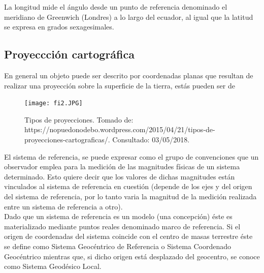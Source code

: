 \documentclass[12pt,hidelinks]{article}
\begin{document}
La longitud mide el ángulo desde un punto de referencia denominado el meridiano de
Greenwich (Londres) a lo largo del ecuador, al igual que la latitud se expresa en grados
sexagesimales.
\subsection{Proyeccción cartográfica}
En general un objeto puede ser descrito por coordenadas planas que resultan de realizar
una proyección sobre la superficie de la tierra, estás pueden ser de
\begin{figure}[H]
    \centering
    \texttt{[image: fi2.JPG]}
    \caption{Tipos de proyecciones. Tomado de: https://nopuedonodebo.wordpress.com/\newline{}2015/04/21/tipos-de-
proyecciones-cartograficas/. Consultado: 03/05/2018.}
    \label{fig:my_label}
\end{figure}
El sistema de referencia, se puede expresar como el grupo de convenciones que un
observador emplea para la medición de las magnitudes físicas de un sistema determinado. Esto
quiere decir que los valores de dichas magnitudes están vinculados al sistema de referencia en
cuestión (depende de los ejes y del origen del sistema de referencia, por lo tanto varia la magnitud
de la medición realizada entre un sistema de referencia a otro).\\[0.05 in]
Dado que un sistema de referencia es un modelo (una concepción) éste es materializado mediante puntos reales denominado marco de referencia. Si el origen de coordenadas del sistema
coincide con el centro de masas terrestre éste se define como Sistema Geocéntrico de Referencia o
Sistema Coordenado Geocéntrico mientras que, si dicho origen está desplazado del geocentro, se
conoce como Sistema Geodésico Local.\\[0.03 in]
\end{document}
